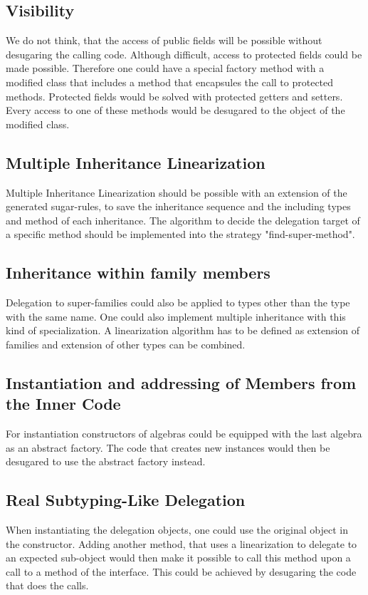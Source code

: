 \documentclass{report}
\begin{document}
\subsection{Visibility}

We do not think, that the access of public fields will be possible without desugaring the calling code. Although difficult, access to protected fields could be made possible. Therefore one could have a special factory method with a modified class that includes a method that encapsules the call to protected methods. Protected fields would be solved with protected getters and setters. Every access to one of these methods would be desugared to the object of the modified class.

\subsection{Multiple Inheritance Linearization}
\label{solutionMultipleInheritanceLinearization}
Multiple Inheritance Linearization should be possible with an extension of the generated sugar-rules, to save the inheritance sequence and the including types and method of each inheritance. The algorithm to decide the delegation target of a specific method should be implemented into the strategy "find-super-method".

\subsection{Inheritance within family members}

Delegation to super-families could also be applied to types other than the type with the same name. One could also implement multiple inheritance with this kind of specialization. A linearization algorithm has to be defined as extension of families and extension of other types can be combined.

\subsection{Instantiation and addressing of Members from the Inner Code}

For instantiation constructors of algebras could be equipped with the last algebra as an abstract factory. The code that creates new instances would then be desugared to use the abstract factory instead.

\subsection{Real Subtyping-Like Delegation}
\label{solutionRealSubtypingLikeDelegation}
When instantiating the delegation objects, one could use the original object in the constructor. Adding another method, that uses a linearization to delegate to an expected sub-object would then make it possible to call this method upon a call to a method of the interface. This could be achieved by desugaring the code that does the calls.
\end{document}

